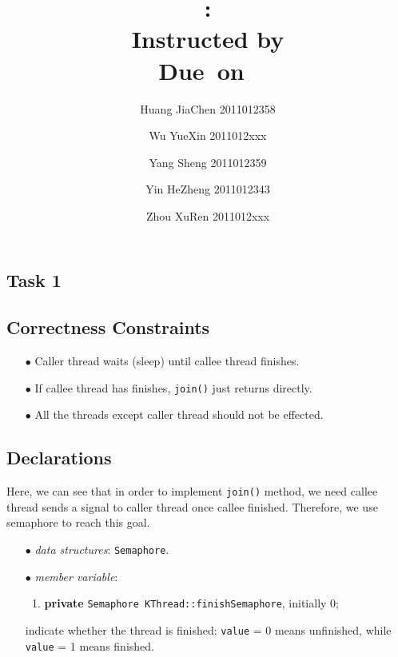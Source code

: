 \documentclass{article}
\title{\textmd{\bf \Class: \Title}\\{\large Instructed by \textit{\ClassInstructor}}\\\normalsize\vspace{0.1in}\small{Due\ on\ \DueDate}}
\date{}
\author{%
  Huang JiaChen 2011012358 \and
  Wu YueXin 2011012xxx \and
  Yang Sheng 2011012359 \and
  Yin HeZheng 2011012343 \and
  Zhou XuRen 2011012xxx}
\begin{document}
  \begin{spacing}{1.1}
    \maketitle \thispagestyle{empty}


\theoremstyle{plain} \newtheorem{computational}{Definition}
    \section{Task 1}

    \subsection{Correctness Constraints}
    \begin{enumerate}
      \item[$\bullet$] Caller thread waits (sleep) until callee thread finishes.
      \item[$\bullet$] If callee thread has finishes, \texttt{join()} just returns
	directly.
      \item[$\bullet$] All the threads except caller thread should not be effected. 
    \end{enumerate}

    \subsection{Declarations}
    Here, we can see that in order to implement \texttt{join()} method, we need callee
    thread sends a signal to caller thread once callee finished. Therefore, we use
    semaphore to reach this goal. 
    \begin{enumerate}
      \item[$\bullet$] \textit{data structures}: \texttt{Semaphore}.
      \item[$\bullet$] \textit{member variable}:
	\begin{enumerate}
	  \item \textbf{private} \texttt{Semaphore KThread::finishSemaphore}, initially 0;
	\end{enumerate}
	indicate whether the thread is finished: \texttt{value} = 0 means unfinished, while
	\texttt{value} = 1 means finished.

    \end{enumerate}


\end{spacing}
\end{document}

